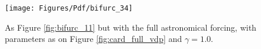\begin{figure}
\texttt{[image: Figures/Pdf/bifurc\_34]}
\caption
{
As Figure \ref{fig:bifurc_11} but with the full astronomical forcing, with parameters as
on Figure \ref{fig:card_full_vdp} and $\gamma=1.0$. 
}
\label{fig:bifurc_34}
\end{figure}
